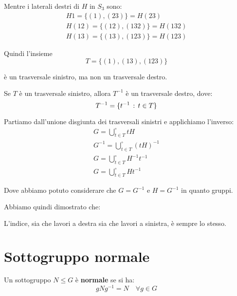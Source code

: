 Mentre i laterali destri di $H$ in $S_3$ sono:
\begin{gather*}
	H1 = \{(1), (23)\} = H(23) \\
	H(12) = \{(12), (132)\} = H(132) \\
	H(13) = \{(13), (123)\} = H(123)
\end{gather*}

Quindi l'insieme
\begin{equation*}
	T = \{(1), (13), (123)\}
\end{equation*}

è un trasversale sinistro, ma non un trasversale destro.

\begin{teorema}
	Se $T$ è un trasversale sinistro, allora $T^{-1}$ è un trasversale destro, dove:
	\begin{equation*}
		T^{-1} = \{t^{-1} \,:\, t \in T\}
	\end{equation*}
\end{teorema}
\begin{dimostrazione}
	Partiamo dall'unione disgiunta dei trasversali sinistri e applichiamo l'inverso:
	\begin{gather*}
		G = \bigcup^\circ_{t \in T} tH \\
		G^{-1} = \bigcup^\circ_{t \in T} (tH)^{-1} \\
		G = \bigcup^\circ_{t \in T} H^{-1}t^{-1} \\
		G = \bigcup^\circ_{t \in T} Ht^{-1}
	\end{gather*}

	Dove abbiamo potuto considerare che $G = G^{-1}$ e $H = G^{-1}$ in quanto gruppi.
\end{dimostrazione}

Abbiamo quindi dimostrato che:

\begin{teorema}
	L'indice, sia che lavori a destra sia che lavori a sinistra, è sempre lo stesso.
\end{teorema}

\section{Sottogruppo normale}
\label{sec:sottogruppo_normale}

Un sottogruppo $N \le G$ è \textbf{normale} se si ha:
\begin{equation*}
	gNg^{-1} = N \quad \forall g \in G
\end{equation*}

